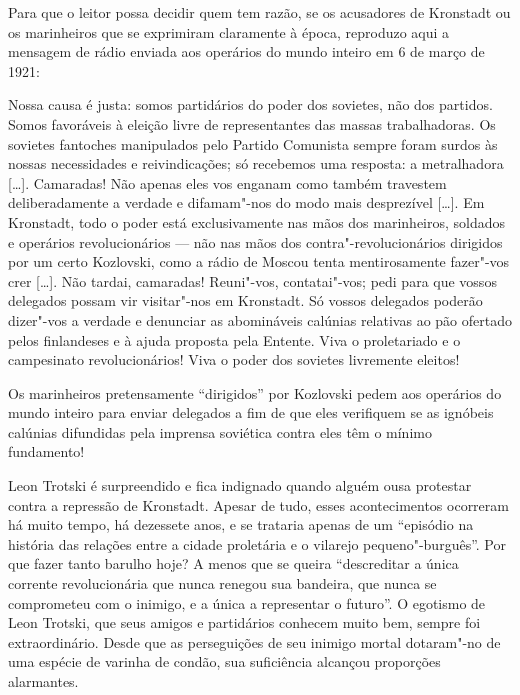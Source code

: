 Para que o leitor possa decidir quem tem razão, se os acusadores de
Kronstadt ou os marinheiros que se exprimiram claramente à época,
reproduzo aqui a mensagem de rádio enviada aos operários do mundo
inteiro em 6 de março de 1921: 

\begin{hedraquote}
Nossa causa é justa: somos partidários
do poder dos sovietes, não dos partidos. Somos favoráveis à eleição
livre de representantes das massas trabalhadoras. Os sovietes fantoches
manipulados pelo Partido Comunista sempre foram surdos às nossas
necessidades e reivindicações; só recebemos uma resposta: a metralhadora
[\ldots]. Camaradas! Não apenas eles vos enganam como também travestem
deliberadamente a verdade e difamam"-nos do modo mais desprezível
[\ldots]. Em Kronstadt, todo o poder está exclusivamente nas mãos dos
marinheiros, soldados e operários revolucionários --- não nas mãos dos
contra"-revolucionários dirigidos por um certo Kozlovski, como a rádio
de Moscou tenta mentirosamente fazer"-vos crer [\ldots]. Não tardai,
camaradas! Reuni"-vos, contatai"-vos; pedi para que vossos delegados
possam vir visitar"-nos em Kronstadt. Só vossos delegados poderão
dizer"-vos a verdade e denunciar as abomináveis calúnias relativas ao
pão ofertado pelos finlandeses e à ajuda proposta pela Entente. Viva o
proletariado e o campesinato revolucionários! Viva o poder dos sovietes
livremente eleitos!
\end{hedraquote}

Os marinheiros pretensamente “dirigidos” por Kozlovski pedem aos
operários do mundo inteiro para enviar delegados a fim de que eles
verifiquem se as ignóbeis calúnias difundidas pela imprensa soviética
contra eles têm o mínimo fundamento!

Leon Trotski é surpreendido e fica indignado quando alguém ousa protestar
contra a repressão de Kronstadt. Apesar de tudo, esses acontecimentos
ocorreram há muito tempo, há dezessete anos, e se trataria apenas de um
“episódio na história das relações entre a cidade proletária e o
vilarejo pequeno"-burguês”. Por que fazer tanto barulho hoje? A menos
que se queira “descreditar a única corrente revolucionária que nunca
renegou sua bandeira, que nunca se comprometeu com o inimigo, e a única
a representar o futuro”. O egotismo de Leon Trotski, que seus amigos e
partidários conhecem muito bem, sempre foi extraordinário. Desde que as
perseguições de seu inimigo mortal dotaram"-no de uma espécie de
varinha de condão, sua suficiência alcançou proporções alarmantes.

